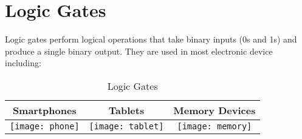 \documentclass{article}
\begin{document}
	
	\section{Logic Gates}
	Logic gates perform logical operations that take binary inputs (0s and 1s) and produce a single binary output. They are used in most electronic device including:
	
	\begin{table}[h!]
		\begin{center}
			\caption{Logic Gates}
			\label{tab:table1}
			\begin{tabular}{|c|c|c|}
				\hline
				Smartphones
				&
				Tablets
				&
				Memory Devices
				\\
				\hline
				\texttt{[image: phone]}
				&
				\texttt{[image: tablet]}
				&
				\texttt{[image: memory]}
				\\
				 \hline
				 
				\end{tabular}
		\end{center}
	\end{table}
\end{document}
